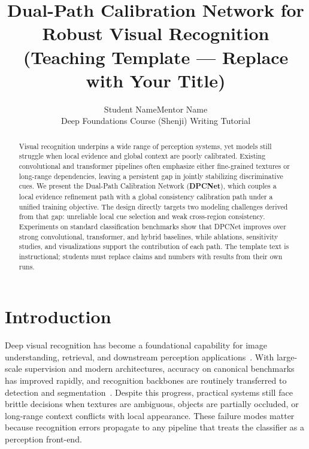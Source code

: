 \documentclass[11pt,a4paper]{article}
\title{Dual-Path Calibration Network for Robust Visual Recognition\\
\large (Teaching Template --- Replace with Your Title)}
\author{Student Name\quad Mentor Name\\
\small Deep Foundations Course (Shenji) Writing Tutorial}
\date{}
\begin{document}
\maketitle

\begin{abstract}
Visual recognition underpins a wide range of perception systems, yet models still struggle when local evidence and global context are poorly calibrated.
Existing convolutional and transformer pipelines often emphasize either fine-grained textures or long-range dependencies, leaving a persistent gap in jointly stabilizing discriminative cues.
We present the Dual-Path Calibration Network (\textbf{DPCNet}), which couples a local evidence refinement path with a global consistency calibration path under a unified training objective.
The design directly targets two modeling challenges derived from that gap: unreliable local cue selection and weak cross-region consistency.
Experiments on standard classification benchmarks show that DPCNet improves over strong convolutional, transformer, and hybrid baselines, while ablations, sensitivity studies, and visualizations support the contribution of each path.
The template text is instructional; students must replace claims and numbers with results from their own runs.
\end{abstract}

\section{Introduction}
\label{sec:intro}

Deep visual recognition has become a foundational capability for image understanding, retrieval, and downstream perception applications~\cite{deng2009imagenet,krizhevsky2012alexnet,he2016resnet}.
With large-scale supervision and modern architectures, accuracy on canonical benchmarks has improved rapidly, and recognition backbones are routinely transferred to detection and segmentation~\cite{ren2015fasterrcnn,ronneberger2015unet,kirillov2023sam}.
Despite this progress, practical systems still face brittle decisions when textures are ambiguous, objects are partially occluded, or long-range context conflicts with local appearance.
These failure modes matter because recognition errors propagate to any pipeline that treats the classifier as a perception front-end.
\end{document}
